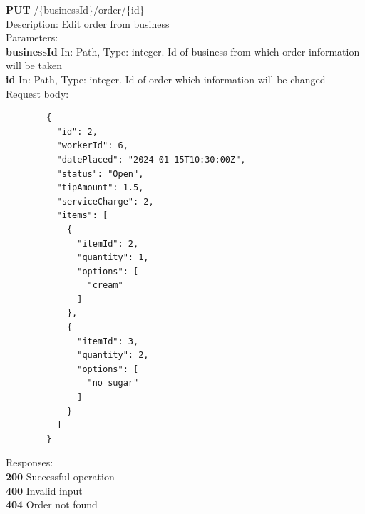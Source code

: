 \documentclass[11pt,a4paper,pdftex]{article}
\begin{document}
\hspace*{1em}\textbf{PUT} /\{businessId\}/order/\{id\}\\
\hspace*{2em}Description: Edit order from business\\
\hspace*{2em}Parameters:\\
\hspace*{3em}\textbf{businessId} In: Path, Type: integer. Id of business from which order information will be taken\\
\hspace*{3em}\textbf{id} In: Path, Type: integer. Id of order which information will be changed\\
\hspace*{2em}Request body:\\
\begin{verbatim}
        {
          "id": 2,
          "workerId": 6,
          "datePlaced": "2024-01-15T10:30:00Z",
          "status": "Open",
          "tipAmount": 1.5,
          "serviceCharge": 2,
          "items": [
            {
              "itemId": 2,
              "quantity": 1,
              "options": [
                "cream"
              ]
            },
            {
              "itemId": 3,
              "quantity": 2,
              "options": [
                "no sugar"
              ]
            }
          ]
        }
\end{verbatim}
\hspace*{2em}Responses:\\
\hspace*{3em}\textbf{200} Successful operation\\
\hspace*{3em}\textbf{400} Invalid input\\
\hspace*{3em}\textbf{404} Order not found
\end{document}
